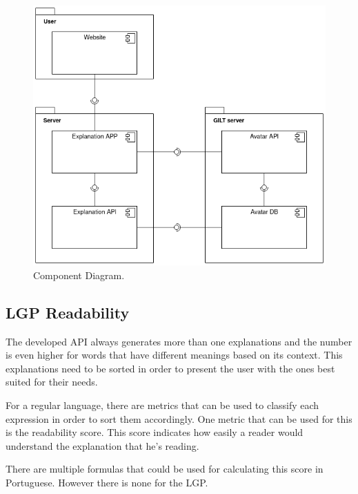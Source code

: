 \documentclass[runningheads]{llncs}
\begin{document}
\begin{figure}[H]
\centering
\includegraphics[scale=0.4]{component_diagram.png}
\caption{Component Diagram.} \label{fig1}
\end{figure}

%


\subsection{LGP Readability}

The developed API always generates more than one explanations and the number is even higher for words that have different meanings based on its context.
This explanations need to be sorted in order to present the user with the ones best suited for their needs.

For a regular language, there are metrics that can be used to classify each expression in order to sort them accordingly.
One metric that can be used for this is the readability score.
This score indicates how easily a reader would understand the explanation that he's reading.

There are multiple formulas that could be used for calculating this score in Portuguese.
However there is none for the LGP.
\end{document}
